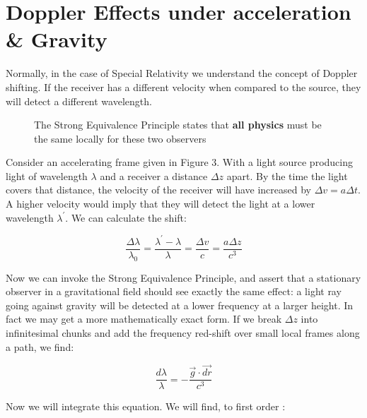 \documentclass[10pt]{article}
\begin{document}
\pagebreak


\section{Doppler Effects under acceleration \& Gravity}

Normally, in the case of Special Relativity we understand the concept of Doppler shifting. If the receiver has a different velocity when compared to the source, they will detect a different wavelength.

\begin{figure}[h!]
\centering

\caption{The Strong Equivalence Principle states that \textbf{all physics} must be the same locally for these two observers}
\label{fig:my_label}
\end{figure}

Consider an accelerating frame given in Figure 3. With a light source producing light of wavelength $\lambda$ and a receiver a distance $\Delta z$ apart. By the time the light covers that distance, the velocity of the receiver will have increased by $\Delta v = a \Delta t$. A higher velocity would imply that they will detect the light at a lower wavelength $\lambda^{\prime}$. We can calculate the shift:

\begin{equation}
\label{Frequency Change Discrete}
    \frac{\Delta{\lambda}}{\lambda_0} = \frac{\lambda^{\prime}-\lambda}{\lambda} = \frac{\Delta v}{c} = \frac{a \Delta z}{c^3}
\end{equation}

Now we can invoke the Strong Equivalence Principle, and assert that a stationary observer in a gravitational field should see exactly the same effect: a light ray going against gravity will be detected at a lower frequency at a larger height. In fact we may get a more mathematically exact form. If we break $\Delta z$ into infinitesimal chunks and add the frequency red-shift over small local frames along a path, we find:

\begin{equation}
\label{Frequency Change continuous}
    \frac{d\lambda}{\lambda} = -\frac{\vec{g}\cdot \vec{dr}}{c^3} 
\end{equation}

 Now we will integrate this equation. We will find, to first order :
\end{document}
